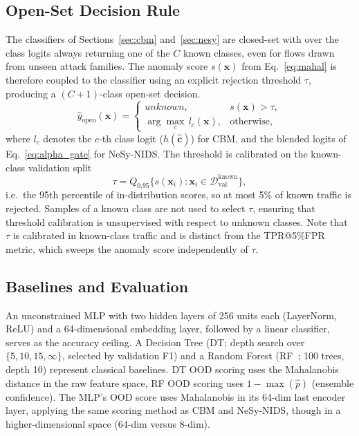 \documentclass[journal]{IEEEtran}
\begin{document}
\subsection{Open-Set Decision Rule}
\label{sec:openset}

The classifiers of Sections~\ref{sec:cbm} and~\ref{sec:nesy} are closed-set with  over the class logits always returning one of the $C$ known classes, even for flows drawn from unseen attack families. The anomaly score $s(\mathbf{x})$ from Eq.~\ref{eq:mahal} is therefore coupled to the classifier using an explicit rejection threshold $\tau$, producing  a $(C{+}1)$-class open-set decision.
\begin{equation}
  \hat{y}_{\mathrm{open}}(\mathbf{x}) =
  \begin{cases}
    \textit{unknown}, & s(\mathbf{x}) > \tau,\\[2pt]
    \arg\max_c\, l_c(\mathbf{x}), & \text{otherwise},
  \end{cases}
\end{equation}
where $l_c$ denotes the $c$-th class logit ($h(\hat{\mathbf{c}})$) for CBM, and the blended logits of Eq.~\ref{eq:alpha_gate} for NeSy-NIDS. The threshold is calibrated on the known-class validation split
\begin{equation}
  \tau = Q_{0.95}\bigl\{s(\mathbf{x}_i) :
        \mathbf{x}_i \in \mathcal{D}_{\mathrm{val}}^{\mathrm{known}}\bigr\},
\end{equation}
i.e.\ the 95th percentile of in-distribution scores, so at most 5\% of known traffic is rejected. Samples of a known class  are not used to select $\tau$, ensuring that threshold calibration is unsupervised with respect to unknown classes. Note that $\tau$ is calibrated in known-class traffic and is distinct from the TPR@5\%FPR metric, which sweeps the anomaly score independently of $\tau$.

\subsection{Baselines and Evaluation}

An unconstrained MLP with two hidden layers of 256 units each (LayerNorm, ReLU) and a 64-dimensional embedding layer, followed by a linear classifier, serves as the accuracy ceiling. A Decision Tree (DT; depth search over $\{5,10,15,\infty\}$, selected by validation F1) and a Random Forest (RF~\cite{breiman2001random}; 100 trees, depth 10) represent classical baselines. DT OOD scoring uses the Mahalanobis distance in the raw feature space, RF OOD scoring uses $1{-}\max(\hat{p})$ (ensemble confidence). The MLP's OOD score uses Mahalanobis in its 64-dim last encoder layer, applying the same scoring method as CBM and NeSy-NIDS, though in a higher-dimensional space (64-dim versus 8-dim).
\end{document}
